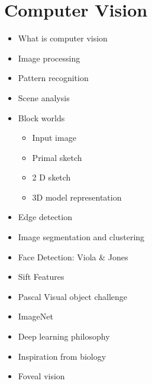 \documentclass[12pt,oneside]{report}
\begin{document}
\section{Computer Vision}
\begin{itemize}
    \item What is computer vision
    \item Image processing
    \item Pattern recognition
    \item Scene analysis
    \item Block worlds
    \begin{itemize}
        \item Input image
        \item Primal sketch
        \item 2 \textonehalf D sketch
        \item 3D model representation
    \end{itemize}
    \item Edge detection
    \item Image segmentation and clustering
    \item Face Detection: Viola \& Jones
    \item Sift Features
    \item Pascal Visual object challenge
    \item ImageNet
    \item Deep learning philosophy
    \item Inspiration from biology
    \item Foveal vision
\end{itemize}
\end{document}
